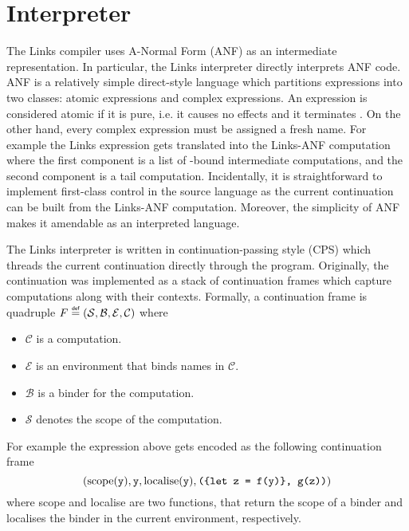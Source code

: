 \section{Interpreter}

The Links compiler uses A-Normal Form (ANF) as an intermediate representation. In particular, the Links interpreter directly interprets ANF code.
ANF is a relatively simple direct-style language which partitions expressions into two classes: atomic expressions and complex expressions. An expression is considered atomic if it is pure, i.e. it causes no effects and it terminates \cite{Flanagan1993}. On the other hand, every complex expression must be assigned a fresh name. For example the Links expression  gets translated into the Links-ANF computation  where the first component is a list of -bound intermediate computations, and the second component is a tail computation. Incidentally, it is straightforward to implement first-class control in the source language as the current continuation can be built from the Links-ANF computation. Moreover, the simplicity of ANF makes it amendable as an interpreted language.

The Links interpreter is written in continuation-passing style (CPS) which threads the current continuation directly through the program. Originally, the continuation was implemented as a stack of continuation frames which capture computations along with their contexts. Formally, a continuation frame is quadruple $F \defas (\mathcal{S},\mathcal{B},\mathcal{E},\mathcal{C})$ where
\begin{itemize}
  \item $\mathcal{C}$ is a computation.
  \item $\mathcal{E}$ is an environment that binds names in $\mathcal{C}$.
  \item $\mathcal{B}$ is a binder for the computation.
  \item $\mathcal{S}$ denotes the scope of the computation.
\end{itemize}
For example the expression above gets encoded as the following continuation frame
\[ \left( \text{scope}(\texttt{y}), \texttt{y}, \text{localise}(\texttt{y}), \texttt{(\{let z = f(y)\}, g(z))} \right) \]
where scope and localise are two functions, that return the scope of a binder and localises the binder in the current environment, respectively.


